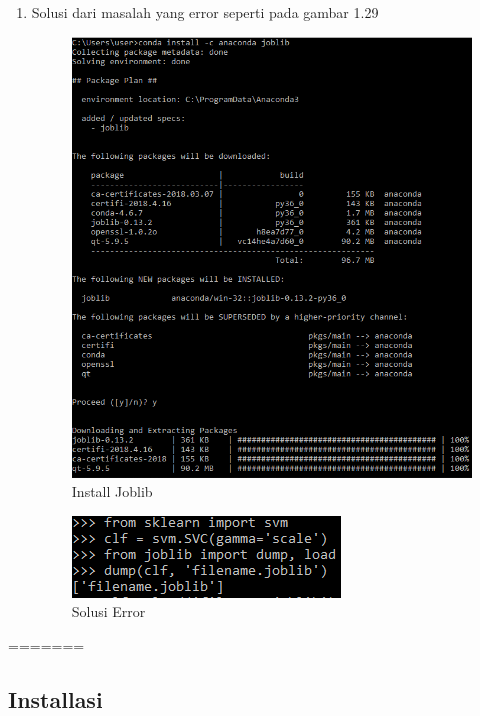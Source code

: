 \begin{enumerate}
\item Solusi dari masalah yang error seperti pada gambar 1.29
\begin{figure}[ht]
\centering
\includegraphics[scale=0.3]{figures/2_17.png}
\caption{Install Joblib}
\end{figure}
\begin{figure}[ht]
\centering
\includegraphics[scale=0.7]{figures/2_18.png}
\caption{Solusi Error}
\end{figure}


\end{enumerate}
=======
\subsection{Installasi}
